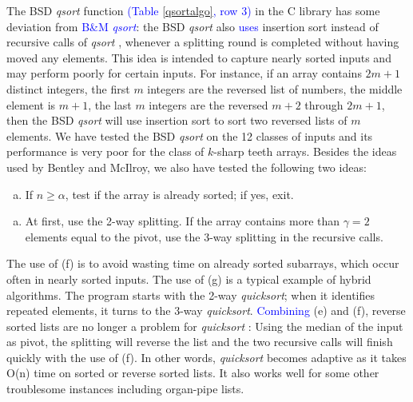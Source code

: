 \documentclass[AMA,STIX1COL]{WileyNJD-v2}
\newcommand{\qusort}{\emph{quicksort }}
\newcommand{\qusortn}{\emph{quicksort}}
\newcommand{\qsort}{\emph{qsort }}
\newcommand{\qsortn}{\emph{qsort}}
\begin{document}
The BSD \qsort function \textcolor{blue}{(Table \ref{qsortalgo}, row 3)} in the C library has some deviation from \textcolor{blue}{B\&M \qsortn}: the BSD \qsort also \textcolor{blue}{uses} insertion sort instead of recursive calls of \qsort, whenever a splitting round is completed without having moved any elements. 
This idea is intended to capture nearly sorted inputs and may perform poorly for certain inputs. 
For instance, if an array contains $2m+1$ distinct integers, the first $m$ integers are the reversed list of numbers, the middle element is $m+1$, the last $m$ integers are the reversed $m+2$ through $2m+1$, then the BSD \qsort will use insertion sort to sort two reversed lists of $m$ elements. 
We have tested the BSD \qsort on the 12 classes of inputs and its performance is very poor for the class of $k$-sharp teeth arrays. 
Besides the ideas used by Bentley and McIlroy, we also have tested the following two ideas:

\begin{enumerate}[(f)]
\item If $n \geq \alpha$, test if the array is already sorted; if yes, exit.
\end{enumerate}
\begin{enumerate}[(g)]
\item At first, use the 2-way splitting. If the array contains more than $\gamma = 2$ elements equal to the pivot, use the 3-way splitting in the recursive calls.
\end{enumerate}

The use of (f) is to avoid wasting time on already sorted subarrays, which occur often in nearly sorted inputs. 
The use of (g) is a typical example of hybrid algorithms.  
The program starts with the 2-way \qusortn; when it identifies repeated elements, it turns to the 3-way \qusortn. 
 \textcolor{blue}{Combining} (e) and (f), reverse sorted lists are no longer a problem for \qusort: Using the median of the input as pivot, the splitting will reverse the list and the two recursive calls will finish quickly with the use of (f). 
In other words, \qusort becomes adaptive as it takes O(n) time on sorted or reverse sorted lists. 
It also works well for some other troublesome instances including organ-pipe lists.
\end{document}
